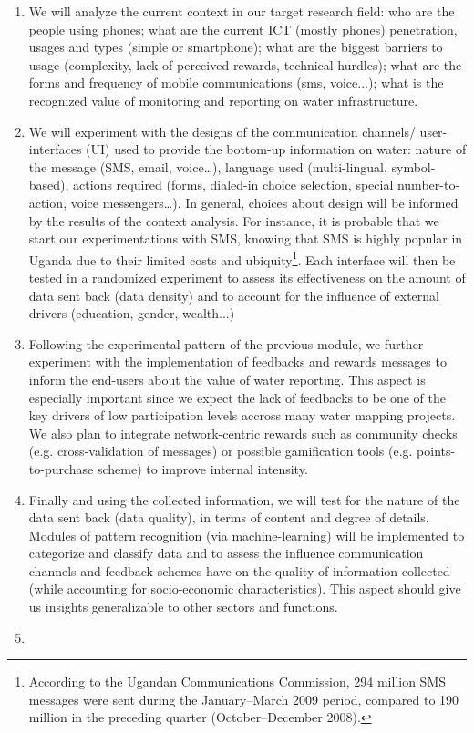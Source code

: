 \documentclass[11pt]{article}
\begin{document}
\begin{enumerate}
\item
We will analyze the current context in our target research field: who are the people using phones; what are the current ICT (mostly phones) penetration, usages and types (simple or smartphone); what are the biggest barriers to usage (complexity, lack of perceived rewards, technical hurdles); what are the forms and frequency of mobile communications (sms, voice...); what is the recognized value of monitoring and reporting on water infrastructure.
\item
We will experiment with the designs of the communication channels/ user-interfaces (UI) used to provide the bottom-up information on water: nature of the message (SMS, email, voice…), language used (multi-lingual, symbol-based), actions required (forms, dialed-in choice selection, special number-to-action, voice messengers…). In general, choices about design will be informed by the results of the context analysis. For instance, it is probable that we start our experimentations with SMS, knowing that SMS is highly popular in Uganda due to their limited costs and ubiquity\footnote{According to the Ugandan Communications Commission, 294 million SMS messages were sent during the January–March 2009 period, compared to 190 million in the preceding quarter (October–December 2008).}.
Each interface will then be tested in a randomized experiment to assess its effectiveness on the amount of data sent back (data density) and to account for the influence of external drivers (education, gender, wealth...)
\item
Following the experimental pattern of the previous module, we further experiment with the implementation of feedbacks and rewards messages to inform the end-users about the value of water reporting. 
This aspect is especially important since we expect the lack of feedbacks to be one of the key drivers of low participation levels accross many water mapping projects.
We also plan to integrate network-centric rewards such as community checks (e.g. cross-validation of messages) or possible gamification tools (e.g. points-to-purchase scheme) to improve internal intensity. 
\item
Finally and using the collected information, we will test for the nature of the data sent back (data quality), in terms of content and degree of details. Modules of pattern recognition (via machine-learning) will be implemented to categorize and classify data and to assess the influence communication channels and feedback schemes have on the quality of information collected (while accounting for socio-economic characteristics). This aspect should give us insights generalizable to other sectors and functions.
\item
\end{enumerate}  
\end{document}
